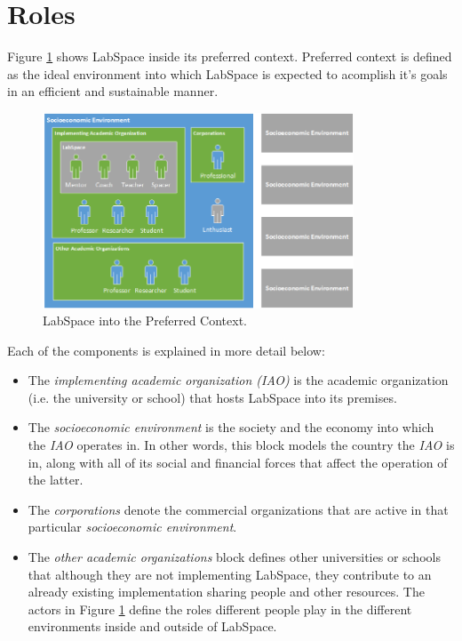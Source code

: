 \documentclass[a4paper, 11pt]{article}
\begin{document}
\section{Roles} \label{sec:roles}
Figure \ref{fig:ls_env} shows LabSpace inside its preferred context. Preferred context is defined as the ideal environment into which LabSpace is expected to acomplish it's goals in an efficient and sustainable manner.

\begin{figure}[h!]
  \begin{center}
    \includegraphics[width=350px,height=\textheight,keepaspectratio]{imagery/ls_context.png}
    \caption{LabSpace into the Preferred Context.}
    \label{fig:ls_env}
  \end{center}
\end{figure}

Each of the components is explained in more detail below:

\begin{itemize}[noitemsep]
    \item The \textit{implementing academic organization (IAO)} is the academic organization (i.e. the university or school) that hosts LabSpace into its premises.
    \item The \textit{socioeconomic environment} is the society and the economy into which the \textit{IAO} operates in. In other words, this block models the country the \textit{IAO} is in, along with all of its social and financial forces that affect the operation of the latter.
    \item The \textit{corporations} denote the commercial organizations that are active in that particular \textit{socioeconomic environment}.
    \item The \textit{other academic organizations} block defines other universities or schools that although they are not implementing LabSpace, they contribute to an already existing implementation sharing people and other resources. The actors in Figure \ref{fig:ls_env} define the roles different people play in the different environments inside and outside of LabSpace. 
\end{itemize}
\end{document}
